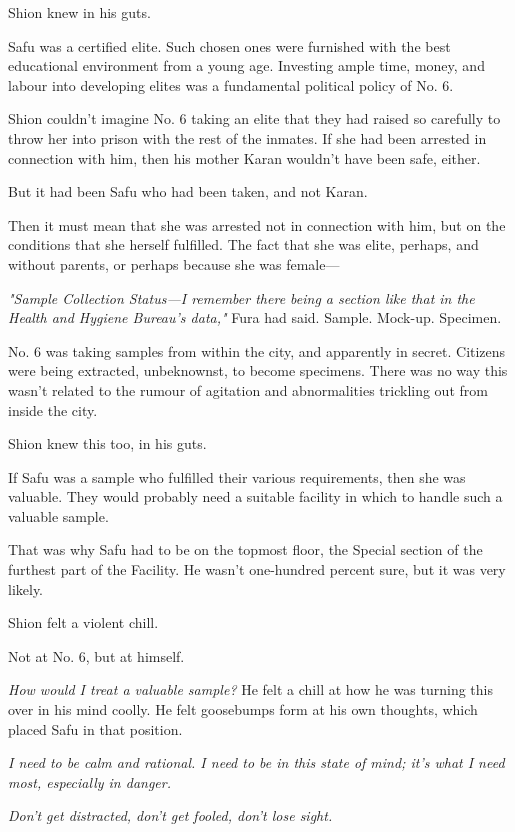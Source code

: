 Shion knew in his guts.

Safu was a certified elite. Such chosen ones were furnished with the
best educational environment from a young age. Investing ample time,
money, and labour into developing elites was a fundamental political
policy of No. 6.

Shion couldn't imagine No. 6 taking an elite that they had raised so
carefully to throw her into prison with the rest of the inmates. If she
had been arrested in connection with him, then his mother Karan wouldn't
have been safe, either.

But it had been Safu who had been taken, and not Karan.

Then it must mean that she was arrested not in connection with him, but
on the conditions that she herself fulfilled. The fact that she was
elite, perhaps, and without parents, or perhaps because she was female---

\emph{"Sample Collection Status---I remember there being a section like that in
the Health and Hygiene Bureau's data,"} Fura had said. Sample. Mock-up.
Specimen.

No. 6 was taking samples from within the city, and apparently in secret.
Citizens were being extracted, unbeknownst, to become specimens. There
was no way this wasn't related to the rumour of agitation and
abnormalities trickling out from inside the city.

Shion knew this too, in his guts.

If Safu was a sample who fulfilled their various requirements, then she
was valuable. They would probably need a suitable facility in which to
handle such a valuable sample.

That was why Safu had to be on the topmost floor, the Special section of
the furthest part of the Facility. He wasn't one-hundred percent sure,
but it was very likely.

Shion felt a violent chill.

Not at No. 6, but at himself.

\emph{How would I treat a valuable sample?} He felt a chill at how he was
turning this over in his mind coolly. He felt goosebumps form at his own
thoughts, which placed Safu in that position.

\emph{I need to be calm and rational. I need to be in this state of mind; it's
what I need most, especially in danger.}

\emph{Don't get distracted, don't get fooled, don't lose sight.}

